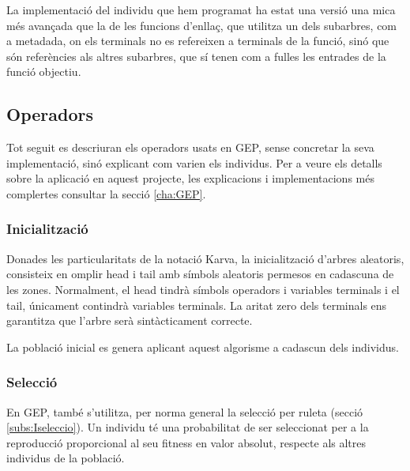 La implementació del individu que hem programat ha estat una versió una mica més
avançada que la de les funcions d'enllaç, que utilitza un dels subarbres, com a
metadada, on els terminals no es refereixen a terminals de la funció, sinó que
són referències als altres subarbres, que sí tenen com a fulles les entrades de
la funció objectiu.



\subsection{Operadors} %
\label{sub:Operadors}

Tot seguit es descriuran els operadors usats en GEP, sense concretar la seva
implementació, sinó explicant com varien els individus.  Per a veure els
detalls sobre la aplicació en aquest projecte, les explicacions i
implementacions més complertes consultar la secció \ref{cha:GEP}.

\subsubsection{Inicialització} %
\label{ssub:Inicialitzacio}
Donades les particularitats de la notació Karva, la inicialització d'arbres
aleatoris, consisteix en omplir head i tail amb símbols aleatoris permesos en
cadascuna de les zones.  Normalment, el head tindrà símbols operadors i
variables terminals i el tail, únicament contindrà variables terminals.  La
aritat zero dels terminals ens garantitza que l'arbre serà sintàcticament
correcte.

La població inicial es genera aplicant aquest algorisme a cadascun dels
individus.

\subsubsection{Selecció} %
\label{ssub:Seleccio}
En GEP, també s'utilitza, per norma general la selecció per ruleta
(secció \ref{subs:Iseleccio}).  Un individu té una probabilitat de ser seleccionat per a
la reproducció proporcional al seu fitness en valor absolut, respecte als altres
individus de la població.

